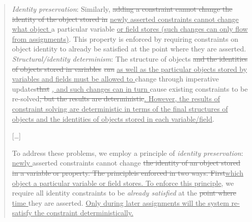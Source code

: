 \documentclass[10pt,twocolumn]{article}
\providecommand{\DIFaddtex}[1]{{\protect\color{BLUE}\uline{#1}}} %
\providecommand{\DIFdeltex}[1]{{\protect\color{gray}\sout{#1}}}                      %
\providecommand{\DIFaddbegin}{} %
\providecommand{\DIFaddend}{} %
\providecommand{\DIFdelbegin}{} %
\providecommand{\DIFdelend}{} %
\providecommand{\DIFadd}[1]{\texorpdfstring{\DIFaddtex{#1}}{#1}} %
\providecommand{\DIFdel}[1]{\texorpdfstring{\DIFdeltex{#1}}{}} %
\begin{document}
\begin{quote}
  {\em Identity preservation}: Similarly, \DIFdelbegin \DIFdel{adding a constraint
  cannot change the identity of the object stored in }\DIFdelend \DIFaddbegin \DIFadd{newly asserted
  constraints cannot change what object }\DIFaddend a particular variable \DIFaddbegin \DIFadd{or field
  stores (such changes can only flow from assignments)}\DIFaddend .  This property
  is enforced by requiring constraints on object identity to already
  be satisfied at the point where they are asserted.\\
  {\em Structural/identity determinism}:  The structure of objects
  \DIFdelbegin \DIFdel{and the identities of objects stored in variables }\emph{\DIFdel{can}}
\DIFdelend \DIFaddbegin \DIFadd{as well as the particular objects stored by variables and fields
  must be allowed to }\DIFaddend change through imperative updates\DIFdelbegin \DIFdel{that }\DIFdelend \DIFaddbegin \DIFadd{, and such
  changes can in turn }\DIFaddend cause existing constraints to be re-solved\DIFdelbegin \DIFdel{, but the results are deterministic}\DIFdelend \DIFaddbegin \DIFadd{.
  However, the results of constraint solving are deterministic in
  terms of the final structures of objects and the identities of objects
  stored in each variable/field}\DIFaddend .
  \begin{center}
    [\dots]
  \end{center}
To address these problems, we employ a principle of \emph{identity
  preservation}: \DIFaddbegin \DIFadd{newly }\DIFaddend asserted constraints cannot change \DIFdelbegin \DIFdel{the identity of
an object stored in a
variable or property.  The principleis enforced
in two ways.  First}\DIFdelend \DIFaddbegin \DIFadd{which object a
particular variable or field stores.  To enforce this principle}\DIFaddend ,
we require all identity constraints to be
\emph{already satisfied} at the \DIFdelbegin \DIFdel{point where }\DIFdelend \DIFaddbegin \DIFadd{time }\DIFaddend they are asserted. \DIFaddbegin \DIFadd{Only
during later assignments will the system re-satisfy the constraint deterministically.
}\DIFaddend 
\end{quote}
\end{document}
